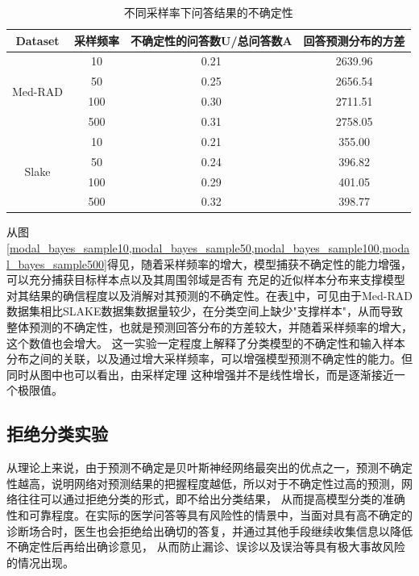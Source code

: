 \begin{table}
	\caption{\label{sample_exm}不同采样率下问答结果的不确定性}
	\centering
	\small %
	\begin{tabular}{c|ccc}
		\hline Dataset & 采样频率 & 不确定性的问答数U/总问答数A & 回答预测分布的方差 \\
		\hline \multirow{4}{*}{Med-RAD} & 10 & 0.21 & 2639.96 \\
		& 50 & 0.25 & 2656.54 \\
		& 100 & 0.30 & 2711.51 \\
		& 500 & 0.31 & 2758.05 \\
		\hline \multirow{4}{*}{Slake} & 10 & 0.21 & 355.00 \\
		& 50 & 0.24 & 396.82 \\
		& 100 & 0.29 & 401.05 \\
		& 500 & 0.32 & 398.77 \\
		\hline
	\end{tabular}
\end{table}
从图\ref{modal_bayes_sample10,modal_bayes_sample50,modal_bayes_sample100,modal_bayes_sample500}得见，随着采样频率的增大，模型捕获不确定性的能力增强，可以充分捕获目标样本点以及其周围邻域是否有
充足的近似样本分布来支撑模型对其结果的确信程度以及消解对其预测的不确定性。在表\ref{sample_exm}中，可见由于Med-RAD数据集相比SLAKE数据集数据量较少，在分类空间上缺少"支撑样本"，从而导致整体预测的不确定性，也就是预测回答分布的方差较大，并随着采样频率的增大，这个数值也会增大。
这一实验一定程度上解释了分类模型的不确定性和输入样本分布之间的关联，以及通过增大采样频率，可以增强模型预测不确定性的能力。但同时从图中也可以看出，由采样定理
这种增强并不是线性增长，而是逐渐接近一个极限值。



\subsection{拒绝分类实验}
从理论上来说，由于预测不确定是贝叶斯神经网络最突出的优点之一，预测不确定性越高，说明网络对预测结果的把握程度越低，所以对于不确定性过高的预测，网络往往可以通过拒绝分类的形式，即不给出分类结果，
从而提高模型分类的准确性和可靠程度。在实际的医学问答等具有风险性的情景中，当面对具有高不确定的诊断场合时，医生也会拒绝给出确切的答复，并通过其他手段继续收集信息以降低不确定性后再给出确诊意见，
从而防止漏诊、误诊以及误治等具有极大事故风险的情况出现。

